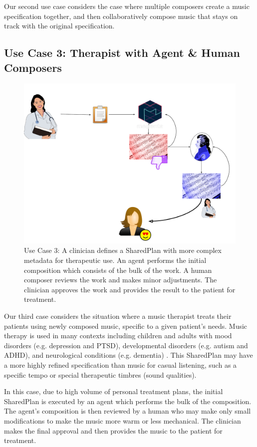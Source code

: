 \documentclass[final,authoryear,5p,times,twocolumn]{elsarticle}
\begin{document}
Our second use case considers the case where multiple composers create a music specification together, and then collaboratively compose music that stays on track with the original specification.

\subsection{Use Case 3: Therapist with Agent \& Human Composers}

\begin{figure}
	\includegraphics[scale=0.35]{clinical.pdf}
	\caption{Use Case 3: A clinician defines a SharedPlan with more complex metadata for therapeutic use. An agent performs the initial composition which consists of the bulk of the work.	A human composer reviews the work and makes minor adjustments. The clinician approves the work and provides the result to the patient for treatment.}
	\label{fig:clinical}
\end{figure}

Our third case considers the situation where a music therapist treats their patients using newly composed music, specific to a given patient's needs. Music therapy is used in many contexts including children and adults with mood disorders (e.g. depression and PTSD), developmental disorders (e.g. autism and ADHD), and neurological conditions (e.g. dementia) \citep{hole2015music}. This SharedPlan may have a more highly refined specification than music for casual listening, such as a specific tempo or special therapeutic timbres (sound qualities). 

In this case, due to high volume of personal treatment plans, the initial SharedPlan is executed by an agent which performs the bulk of the composition. The agent's composition is then reviewed by a human who may make only small modifications to make the music more warm or less mechanical. The clinician makes the final approval and then provides the music to the patient for treatment.
\end{document}
